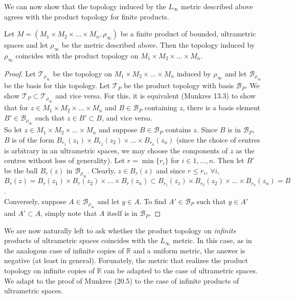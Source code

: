 We can now show that the topology induced by the $L_\infty$ metric described above agrees with the product topology for finite products.

\begin{proposition*}
Let $M=(M_{1} \times M_{2} \times \ldots \times M_{n},\rho_\infty)$ be a finite product of bounded, ultrametric spaces and let $\rho_\infty$ be the metric described above.  Then the topology induced by $\rho_\infty$ coincides with the product topology on $M_{1} \times M_{2} \times \ldots \times M_{n}$.
\end{proposition*}

\begin{proof}
Let $\mathcal{T}_{\rho_\infty}$ be the topology on $M_{1} \times M_{2} \times \ldots \times M_{n}$ induced by $\rho_\infty$ and let $\mathcal{B}_{\rho_\infty}$ be the basis for this topology. Let $\mathcal{T}_{P}$ be the product topology with basis $\mathcal{B}_P$. We show $\mathcal{T}_{P} \subset \mathcal{T}_{\rho_\infty}$ and vice versa. For this, it is equivalent (Munkres 13.3) to show that for $z \in  M_{1} \times M_{2} \times \ldots \times M_{n}$ and $B \in \mathcal{B}_{P}$ containing $z$, there is a basis element $B' \in \mathcal{B}_{\rho_\infty}$ such that $z \in B' \subset B$, and vice versa.\\

So let  $z \in M_{1} \times M_{2} \times \ldots \times M_{n}$ and suppose $B \in \mathcal{B}_{P}$ contains $z$. Since $B$ is in $\mathcal{B}_{P}$, $B$ is of the form $B_{r_1}(z_1) \times B_{r_2}(z_2) \times \ldots \times B_{r_n}(z_n)$ (since the choice of centres is arbitrary in an ultrametric spaces, we may choose the components of $z$ as the centres without loss of generality). Let $r=\min \{r_i\}$ for $i \in 1,\ldots, n$. Then let $B'$ be the ball $B_r(z)$ in $ \mathcal{B}_{\rho_\infty}$. Clearly, $z \in B_r(z)$ and since $r \leq r_i$, $\forall i$, $B_r(z) = B_r(z_1) \times B_r(z_2) \times \ldots \times B_r(z_n) \subset  B_{r_1}(z_1) \times B_{r_2}(z_2) \times \ldots \times B_{r_n}(z_n) =B$.\\

Conversely, suppose $A \in \mathcal{B}_{\rho_\infty}$ and let $y \in A$. To find $A' \in \mathcal{B}_{P}$ such that $y \in A'$ and $A' \subset A$, simply note that $A$ itself is in $\mathcal{B}_{P}$.

\end{proof}

We are now naturally left to ask whether the product topology on \textit{infinite} products of ultrametric spaces coincides with the $L_\infty$ metric. In this case, as in the analogous case of infinite copies of $\mathbb{R}$ and a uniform metric, the answer is negative (at least in general). Forunately, the metric that realizes the product topology on infinite copies of $\mathbb{R}$ can be adapted to the case of ultrametric spaces. We adapt to the proof of Munkres (20.5) to the case of infinite products of ultrametric spaces.

